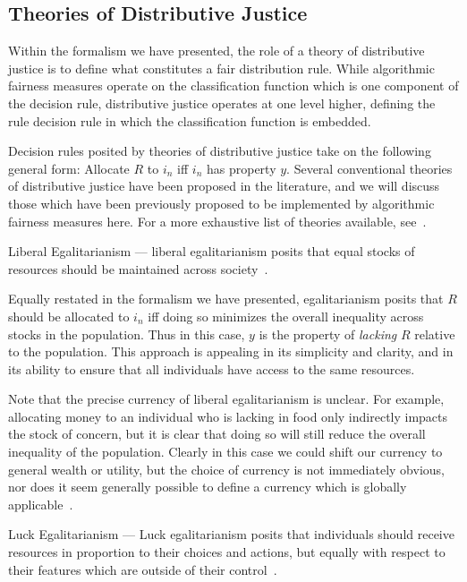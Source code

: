 \subsection{Theories of Distributive Justice}

Within the formalism we have presented, the role of a theory of distributive
justice is to define what constitutes a fair distribution rule. While 
algorithmic fairness measures operate on the classification function which is
one component of the decision rule, distributive justice operates at one level
higher, defining the rule decision rule in which the classification function is
embedded.

Decision rules posited by theories of distributive justice take on the following
general form: Allocate $R$ to $i_n$ iff $i_n$ has property $y$. Several
conventional theories of distributive justice have been proposed in the
literature, and we will discuss those which have been previously proposed to be
implemented by algorithmic fairness measures here. For a more exhaustive list of
theories available, see~\cite{Kuppler_2021}.

\begin{definition}
    Liberal Egalitarianism — liberal egalitarianism posits that equal stocks of
    resources should be maintained across society~\cite{Rawls_1971}.
\end{definition}

Equally restated in the formalism we have presented, egalitarianism posits that
$R$ should be allocated to $i_n$ iff doing so minimizes the overall inequality
across stocks in the population. Thus in this case, $y$ is the property of
\textit{lacking} $R$ relative to the population. This approach is appealing in
its simplicity and clarity, and in its ability to ensure that all individuals
have access to the same resources.

Note that the precise currency of liberal egalitarianism is unclear. For
example, allocating money to an individual who is lacking in food only
indirectly impacts the stock of concern, but it is clear that doing so will
still reduce the overall inequality of the population. Clearly in this case we
could shift our currency to general wealth or utility, but the choice of
currency is not immediately obvious, nor does it seem generally possible to
define a currency which is globally applicable~\cite{Binns_2018}.

\begin{definition}
    Luck Egalitarianism — Luck egalitarianism posits that individuals should
    receive resources in proportion to their choices and actions, but equally
    with respect to their features which are outside of their
    control~\cite{Knight_2013}.
\end{definition}

